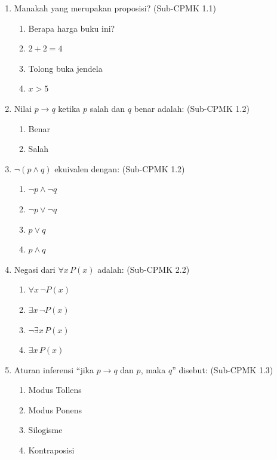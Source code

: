 \begin{enumerate}
  \item Manakah yang merupakan proposisi? (Sub-CPMK 1.1)
  \begin{enumerate}
    \item Berapa harga buku ini?
    \item $2 + 2 = 4$
    \item Tolong buka jendela
    \item $x > 5$
  \end{enumerate}
  
  \item Nilai $p \rightarrow q$ ketika $p$ salah dan $q$ benar adalah: (Sub-CPMK 1.2)
  \begin{enumerate}
    \item Benar
    \item Salah
  \end{enumerate}
  
  \item $\neg(p \wedge q)$ ekuivalen dengan: (Sub-CPMK 1.2)
  \begin{enumerate}
    \item $\neg p \wedge \neg q$
    \item $\neg p \vee \neg q$
    \item $p \vee q$
    \item $p \wedge q$
  \end{enumerate}
  
  \item Negasi dari $\forall x \, P(x)$ adalah: (Sub-CPMK 2.2)
  \begin{enumerate}
    \item $\forall x \, \neg P(x)$
    \item $\exists x \, \neg P(x)$
    \item $\neg \exists x \, P(x)$
    \item $\exists x \, P(x)$
  \end{enumerate}
  
  \item Aturan inferensi ``jika $p \rightarrow q$ dan $p$, maka $q$'' disebut: (Sub-CPMK 1.3)
  \begin{enumerate}
    \item Modus Tollens
    \item Modus Ponens
    \item Silogisme
    \item Kontraposisi
  \end{enumerate}
  

\end{enumerate}
